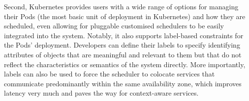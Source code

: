 Second, Kubernetes provides users with a wide range of options for managing their Pods (the most basic unit of deployment in Kubernetes) and how they are scheduled, even allowing for pluggable customised schedulers to be easily integrated into the system. Notably, it also supports label-based constraints for the Pods' deployment. Developers can define their labels to specify identifying attributes of objects that are meaningful and relevant to them but that do not reflect the characteristics or semantics of the system directly. 
More importantly, labels can also be used to force the scheduler to colocate services that communicate predominantly within the same availability zone, which improves latency very much and paves the way for context-aware services. %




